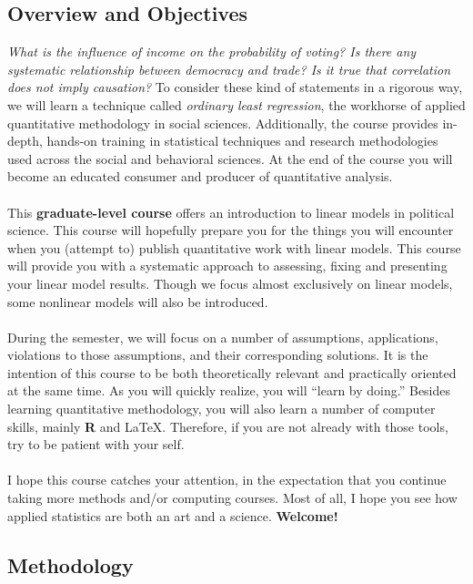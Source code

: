 \documentclass[letterpaper]{article}
\begin{document}
\subsection*{Overview and Objectives}

\emph{What is the influence of income on the probability of voting? Is there any systematic relationship between democracy and trade? Is it true that correlation does not imply causation?} To consider these kind of statements in a rigorous way, we will learn a technique called \emph{ordinary least regression}, the workhorse of applied quantitative methodology in social sciences. Additionally, the course provides in-depth, hands-on training in statistical techniques and research methodologies used across the social and behavioral sciences. At the end of the course you will become an educated consumer and producer of quantitative analysis.
\\
\\
This {\bf {\color{blue}graduate-level course}} offers an introduction to linear models in political science. This course will hopefully prepare you for the things you will encounter when you (attempt to) publish quantitative work with linear models. This course will provide you with a systematic approach to assessing, fixing and presenting your linear model results. Though we focus almost exclusively on linear models, some nonlinear models will also be introduced. 
\\
\\
During the semester, we will focus on a number of assumptions, applications, violations to those assumptions, and their corresponding solutions. It is the intention of this course to be both theoretically relevant and practically oriented at the same time. As you will quickly realize, you will ``learn by doing.'' Besides learning quantitative methodology, you will also learn a number of computer skills, mainly {\bf R} and \LaTeX. Therefore, if you are not already with those tools, try to be patient with your self.
\\
\\
I hope this course catches your attention, in the expectation that you continue taking more methods and/or computing courses. Most of all, I hope you see how applied statistics are both an art and a science. {\bf Welcome!}



\subsection*{Methodology}
\end{document}
